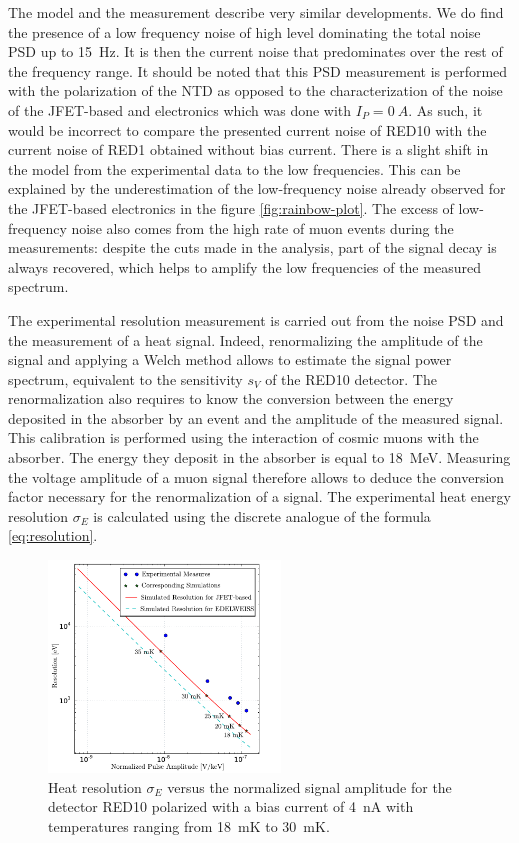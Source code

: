 The model and the measurement describe very similar developments. We do find the presence of a low frequency noise of high level dominating the total noise PSD up to \SI{15}{\Hz}. It is then the current noise that predominates over the rest of the frequency range.
It should be noted that this PSD measurement is performed with the polarization of the NTD as opposed to the characterization of the noise of the JFET-based and \Edelweiss{} electronics which was done with $I_P = \SI{0}{A}$. As such, it would be incorrect to compare the presented current noise of RED10 with the current noise of RED1 obtained without bias current.
There is a slight shift in the model from the experimental data to the low frequencies. This can be explained by the underestimation of the low-frequency noise already observed for the JFET-based electronics in the figure \ref{fig:rainbow-plot}. The excess of low-frequency noise also comes from the high rate of muon events during the measurements: despite the cuts made in the analysis, part of the signal decay is always recovered, which helps to amplify the low frequencies of the measured spectrum.

The experimental resolution measurement is carried out from the noise PSD and the measurement of a heat signal. Indeed, renormalizing the amplitude of the signal and applying a Welch method allows to estimate the signal power spectrum, equivalent to the sensitivity $s_V$ of the RED10 detector. The renormalization also requires to know the conversion between the energy deposited in the absorber by an event and the amplitude of the measured signal. This calibration is performed using the interaction of cosmic muons with the absorber. The energy they deposit in the absorber is equal to \SI{18}{\mega\eV}. Measuring the voltage amplitude of a muon signal therefore allows to deduce the conversion factor necessary for the renormalization of a signal. The experimental heat energy resolution $\sigma_E$ is calculated using the discrete analogue of the formula \ref{eq:resolution}.

\begin{figure}[!ht]
\begin{center}
\includegraphics[width=0.55\textwidth]{Figures/Ethem/resamp_fin_fin.pdf}
\end{center}
\caption{Heat resolution $\sigma_E$ versus the normalized signal amplitude for the detector RED10 polarized with a bias current of \SI{4}{\nano\ampere}  with temperatures ranging from \SI{18}{\milli\kelvin} to \SI{30}{\milli\kelvin}.}
\label{fig:amp-res-red10}
\end{figure}

